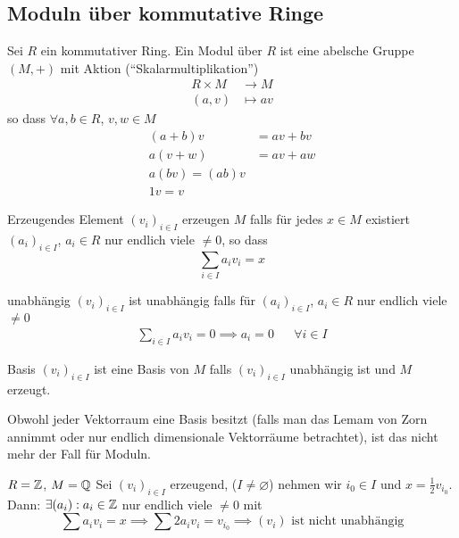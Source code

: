 \subsection{Moduln über kommutative Ringe}
\begin{Def}
  Sei $R$ ein kommutativer Ring. Ein Modul über $R$ ist eine abelsche Gruppe $(M,+)$ mit Aktion (``Skalarmultiplikation'')
  \begin{align*}
    R\times M&\to M\\
    \left( a,v \right)&\mapsto av
  \end{align*}
  so dass $\forall a,b\in R$, $v,w\in M$
  \begin{align*}
    \left( a+b \right)v&=av+bv\\
    a\left( v+w \right)&=av+aw\\
    a\left( bv \right)=\left( ab \right)v\\
    1v=v
  \end{align*}
\end{Def}
\begin{Def}{Erzeugendes Element}
  $\left( v_i \right)_{i\in I}$ erzeugen $M$ falls für jedes $x\in M$ existiert $\left( a_i \right)_{i\in I}$, $a_i\in R$ nur endlich viele $\neq 0$, so dass
  \[\sum_{i\in I}a_iv_i=x\]
\end{Def}
\begin{Def}{unabhängig}
  $\left( v_i \right)_{i\in I}$ ist unabhängig falls für $(a_i)_{i\in I}$, $a_i\in R$ nur endlich viele $\neq 0$
  \begin{align*}
    \sum_{i\in I}a_iv_i=0\implies a_i=0&&\forall i\in I
  \end{align*}
\end{Def}
\begin{Def}{Basis}
  $\left( v_i \right)_{i\in I}$ ist eine Basis von $M$ falls $\left( v_i \right)_{i\in I}$ unabhängig ist und $M$ erzeugt.
\end{Def}
\begin{Bem}
  Obwohl jeder Vektorraum eine Basis besitzt (falls man das Lemam von Zorn annimmt oder nur endlich dimensionale Vektorräume betrachtet), ist das nicht mehr der Fall für Moduln.
\end{Bem}
\begin{Bsp}
  $R=\mathbb{Z}$, $M=\mathbb{Q}$ Sei $(v_i)_{i\in I}$ erzeugend, ($I\neq\varnothing$) nehmen wir $i_0\in I$ und $x=\frac{1}{2}v_{i_0}$. Dann: $\exists (a_i):a_i\in \mathbb{Z}$ nur endlich viele $\neq 0$ mit
  \[\sum a_iv_i=x\implies \sum 2a_iv_i=v_{i_0}\implies \text{$(v_i)$ ist nicht unabhängig}\]
\end{Bsp}
